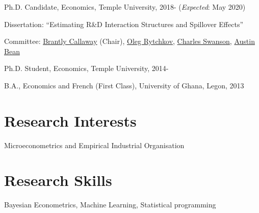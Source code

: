 \documentclass[12pt,letterpaper]{article}
\renewenvironment{itemize}{
  \begin{list}{}{
    \setlength{\leftmargin}{1.5em}
  }
}{
  \end{list}
}
\begin{document}
\begin{itemize}
  \item Ph.D. Candidate, Economics, Temple University, 2018- (\textit{Expected}: May 2020)

  \begin{itemize}
    \item Dissertation: ``Estimating R\&D Interaction Structures and Spillover Effects''
    \item Committee:   \href{https://bcallaway11.github.io/index.html}
    {Brantly Callaway} (Chair), \href{https://astro.temple.edu/~rytchkov/}{Oleg Rytchkov}, \href{https://liberalarts.temple.edu/academics/faculty/swanson-charles}{Charles Swanson}, \href{https://liberalarts.temple.edu/academics/faculty/bean-austin}{Austin Bean} 
  \end{itemize}

	\item Ph.D. Student, Economics, Temple University, 2014-

  \item B.A., Economics and French (First Class), University of Ghana, Legon, 2013
\end{itemize}

\section*{Research Interests}
\begin{itemize}
  \item Microeconometrics and Empirical Industrial Organisation
\end{itemize}

\section*{Research Skills}
\begin{itemize}
	\item Bayesian Econometrics, Machine Learning, Statistical programming
\end{itemize}
\end{document}
